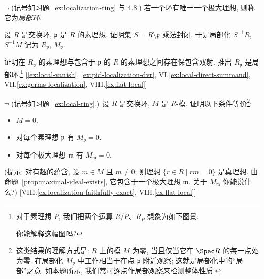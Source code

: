 \begin{prob}
\label{ex:local-ring}
$\neg$ (记号如习题~\ref{ex:localization-ring} 与 4.8.) 若一个环有唯一一个极大理想, 则称它为\emph{局部环}.

\noindent 设 $R$ 是交换环, $\mathfrak{p}$ 是 $R$ 的素理想. 证明集 $S=R\setminus\mathfrak{p}$ 乘法封闭. 于是局部化 $S^{-1}R$, $S^{-1}M$ 记为 $R_\mathfrak{p}$, $M_\mathfrak{p}$.

证明在 $R_\mathfrak{p}$ 的素理想与包含于 $\mathfrak{p}$ 的 $R$ 的素理想之间存在保包含双射. 推出 $R_\mathfrak{p}$ 是局部环.\footnote{对于素理想 $P$, 我们把两个运算 $R/P$、$R_P$ 想象为如下图景. \begin{center}
\end{center}你能解释这幅图吗?} [\ref{ex:local-vanish}, \ref{ex:pid-localization-dvr}, VI.\ref{ex:local-direct-summand}, VII.\ref{ex:germs-localization}, VIII.\ref{ex:flat-local}]
\end{prob}

\begin{prob}
\label{ex:local-vanish}
$\neg$ (记号如习题~\ref{ex:local-ring}.) 设 $R$ 是交换环, $M$ 是 $R$-模. 证明以下条件等价\footnote{这类结果的理解方式是: $R$ 上的模 $M$ 为零, 当且仅当它在 $\Spec R$ 的每一点处为零. 在局部化 $M_\mathfrak{p}$ 中工作相当于在点 $\mathfrak{p}$ 附近观察; 这就是局部化中的``局部''之意. 如本题所示, 我们常可逐点作局部观察来检测整体性质.}:
\begin{itemize}
\item $M=0$.
\item 对每个素理想 $\mathfrak{p}$ 有 $M_\mathfrak{p}=0$.
\item 对每个极大理想 $\mathfrak{m}$ 有 $M_\mathfrak{m}=0$.
\end{itemize}
(提示: 对有趣的蕴含, 设 $m\in M$ 且 $m\neq0$; 则理想 $\{r\in R\mid rm=0\}$ 是真理想. 由命题~\ref{prop:maximal-ideal-exists}, 它包含于一个极大理想 $\mathfrak{m}$. 关于 $M_\mathfrak{m}$ 你能说什么?) [VIII.\ref{ex:localization-faithfully-exact}, VIII.\ref{ex:flat-local}]
\end{prob}

